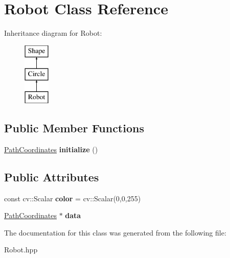 \hypertarget{class_robot}{}\section{Robot Class Reference}
\label{class_robot}
Inheritance diagram for Robot\+:\begin{figure}[H]
\begin{center}
\leavevmode
\includegraphics[height=3.000000cm]{class_robot}
\end{center}
\end{figure}
\subsection*{Public Member Functions}
\begin{DoxyCompactItemize}
\item 
\mbox{\label{class_robot_a80c1083dea6724f840e7900210359f2a}} 
\mbox{\hyperlink{class_path_coordinates}{Path\+Coordinates}} {\bfseries initialize} ()
\end{DoxyCompactItemize}
\subsection*{Public Attributes}
\begin{DoxyCompactItemize}
\item 
\mbox{\label{class_robot_a8f89b1b5df8f5e247e608787923fe06c}} 
const cv\+::\+Scalar {\bfseries color} = cv\+::\+Scalar(0,0,255)
\item 
\mbox{\label{class_robot_a0bda826aa4ed4fd9508fdbe02648d123}} 
\mbox{\hyperlink{class_path_coordinates}{Path\+Coordinates}} $\ast$ {\bfseries data}
\end{DoxyCompactItemize}


The documentation for this class was generated from the following file\+:\begin{DoxyCompactItemize}
\item 
Robot.\+hpp\end{DoxyCompactItemize}

